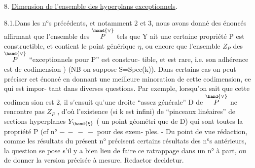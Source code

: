 
8. \uline{Dimension de l'ensemble des hyperplans exceptionnels}.

8.1.Dans les n°s précédents, et notamment 2 et 3, nous avons donné des
énoncés affirmant que l'ensemble des \hand{$\xi\in$} $\overset{\hand{\vee}}{P}$ tels que Y ait une certaine
propriété P est constructible, et contient le point générique $\eta$,  ou
encore que l'ensemble $Z_P$ des \hand{$\xi\in$} $\overset{\hand{\vee}}{P}$ ``exceptionnels pour P'' est construc-%
tible, et est rare, i.e. son adhérence est de codimension \hand{$\geq$} ) 
(NB on suppose S=Spec(k)). Dans certains cas on peut préciser cet énoncé
en donnant une meilleure minoration de cette codimension, ce qui est impor-%
tant dans diverses questions. Par exemple, lorsqu'on sait que cette codimen
sion est \hand{$\geq$} 2, il s'ensuit qu'une droite ``assez générale'' D de $\overset{\hand{\vee}}{P}$
ne rencontre pas $Z_P$ , d'où l'existence (si k est infini) de ``pinceaux
linéaires'' de sections hyperplanes  $Y_{\hand{\xi}}$ (\hand{$\xi$} un point géométri
que de D) qui sont toutes la propriété P (cf n° $-\ -\ -\ -$ pour des exem-%
ples. - Du point de vue rédaction, comme les résultats du présent n°
précisent certains résultats des n°s antérieurs, la question se pose s'il
y a bien lieu de faire ce ratrappage dans un n° à part, ou de donner la
version précisée à mesure. Redactor decidetur.



